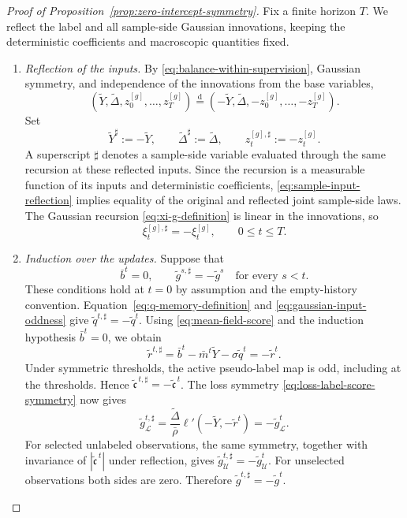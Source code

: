 \begin{proof}[Proof of Proposition~\ref{prop:zero-intercept-symmetry}]
Fix a finite horizon $T$.
We reflect the label and all sample-side Gaussian innovations,
keeping the deterministic coefficients and macroscopic
quantities fixed.

\begin{enumerate}[wide]
    \item \emph{Reflection of the inputs.}
    By \eqref{eq:balance-within-supervision}, Gaussian
    symmetry, and independence of the innovations from
    the base variables,
    \begin{equation}
        (\tilde Y,\tilde\Delta,z_0^{[g]},\ldots,z_T^{[g]})
        \stackrel{\mathrm d}{=}
        (-\tilde Y,\tilde\Delta,-z_0^{[g]},\ldots,-z_T^{[g]}).
        \label{eq:sample-input-reflection}
    \end{equation}
    Set
    \[
        \tilde Y^\sharp:=-\tilde Y,
        \qquad
        \tilde\Delta^\sharp:=\tilde\Delta,
        \qquad
        z_t^{[g],\sharp}:=-z_t^{[g]}.
    \]
    A superscript $\sharp$ denotes a sample-side variable
    evaluated through the same recursion at these reflected
    inputs. Since the recursion is a measurable function
    of its inputs and deterministic coefficients,
    \eqref{eq:sample-input-reflection} implies equality
    of the original and reflected joint sample-side laws.
    The Gaussian recursion \eqref{eq:xi-g-definition}
    is linear in the innovations, so
    \begin{equation}
        \xi_t^{[g],\sharp}=-\xi_t^{[g]},
        \qquad 0\leq t\leq T.
        \label{eq:gaussian-input-oddness}
    \end{equation}

    \item \emph{Induction over the updates.}
    Suppose that
    \[
        \bar b^t=0,
        \qquad
        \tilde g^{s,\sharp}=-\tilde g^s
        \quad\text{for every }s<t.
    \]
    These conditions hold at $t=0$ by assumption and
    the empty-history convention.
    Equation~\eqref{eq:q-memory-definition} and
    \eqref{eq:gaussian-input-oddness} give
    \(
        \tilde q^{t,\sharp}=-\tilde q^t
    \).
    Using \eqref{eq:mean-field-score} and the induction hypothesis
    $\bar b^t=0$, we obtain
    \[
        \tilde r^{t,\sharp}
        =
        \bar b^t-\bar m^t\tilde Y-\sigma\tilde q^t
        =
        -\tilde r^t.
    \]
    Under symmetric thresholds, the active pseudo-label
    map is odd, including at the thresholds. Hence
    \(
        \tilde{\mathfrak c}^{\,t,\sharp}
        =
        -\tilde{\mathfrak c}^{\,t}
    \).
    The loss symmetry \eqref{eq:loss-label-score-symmetry}
    now gives
    \[
        \tilde g_{\mathcal L}^{t,\sharp}
        =
        \frac{\tilde\Delta}{\bar\rho}
            \ell'(-\tilde Y,-\tilde r^t)
        =
        -\tilde g_{\mathcal L}^t.
    \]
    For selected unlabeled observations, the same symmetry,
    together with invariance of
    $|\tilde{\mathfrak c}^{\,t}|$ under reflection, gives
    \(
        \tilde g_{\mathcal U}^{t,\sharp}
        =
        -\tilde g_{\mathcal U}^t
    \).
    For unselected observations both sides are zero.
    Therefore $\tilde g^{t,\sharp}=-\tilde g^t$.


\end{enumerate}
\end{proof}
